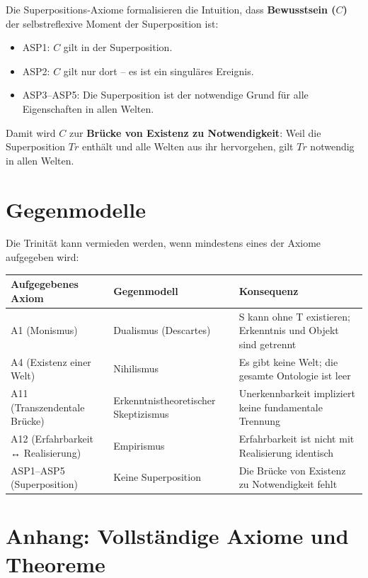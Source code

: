 \documentclass[
]{article}
\begin{document}
Die Superpositions-Axiome formalisieren die Intuition, dass \textbf{Bewusstsein (\(C\))} der selbstreflexive Moment der Superposition ist:

\begin{itemize}
\item ASP1: \(C\) gilt in der Superposition.
\item ASP2: \(C\) gilt nur dort – es ist ein singuläres Ereignis.
\item ASP3–ASP5: Die Superposition ist der notwendige Grund für alle Eigenschaften in allen Welten.
\end{itemize}

Damit wird \(C\) zur \textbf{Brücke von Existenz zu Notwendigkeit}: Weil die Superposition \(Tr\) enthält und alle Welten aus ihr hervorgehen, gilt \(Tr\) notwendig in allen Welten.

\section{Gegenmodelle}

Die Trinität kann vermieden werden, wenn mindestens eines der Axiome aufgegeben wird:

\begin{table}[h]
\centering
\begin{tabular}{lll}
\toprule
\textbf{Aufgegebenes Axiom} & \textbf{Gegenmodell} & \textbf{Konsequenz} \\
\midrule
A1 (Monismus) & Dualismus (Descartes) & S kann ohne T existieren; Erkenntnis und Objekt sind getrennt \\
A4 (Existenz einer Welt) & Nihilismus & Es gibt keine Welt; die gesamte Ontologie ist leer \\
A11 (Transzendentale Brücke) & Erkenntnistheoretischer Skeptizismus & Unerkennbarkeit impliziert keine fundamentale Trennung \\
A12 (Erfahrbarkeit ↔ Realisierung) & Empirismus & Erfahrbarkeit ist nicht mit Realisierung identisch \\
ASP1–ASP5 (Superposition) & Keine Superposition & Die Brücke von Existenz zu Notwendigkeit fehlt \\
\bottomrule
\end{tabular}
\end{table}

\section{Anhang: Vollständige Axiome und Theoreme}
\end{document}
